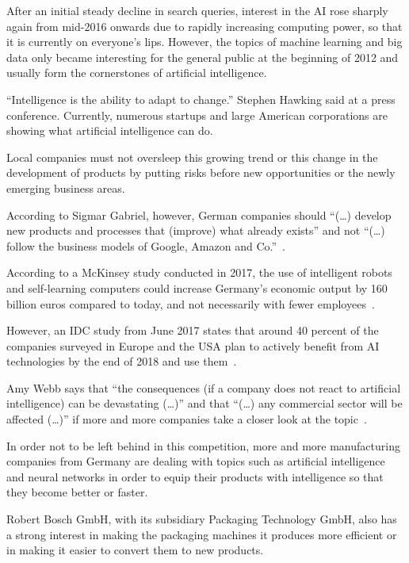 After an initial steady decline in search queries, interest in the AI rose sharply again from mid-2016 onwards due to
rapidly increasing computing power, so that it is currently on everyone's lips. However, the topics of machine learning
and big data only became interesting for the general public at the beginning of 2012 and usually form the cornerstones
of artificial intelligence.

\enquote{Intelligence is the ability to adapt to change.} Stephen Hawking said at a press conference. Currently,
numerous startups and large American corporations are showing what artificial intelligence can do.

Local companies must not oversleep this growing trend or this change in the development of products by putting risks
before new opportunities or the newly emerging business areas.

According to Sigmar Gabriel, however, German companies should \enquote{(\ldots) develop new products and processes that
(improve) what already exists} and not \enquote{(\ldots) follow the business models of Google, Amazon and
Co.}~\cite{article_einleitung_ww_sg}.

According to a McKinsey study conducted in 2017, the use of intelligent robots and self-learning computers could
increase Germany's economic output by 160 billion euros compared to today, and not necessarily with fewer
employees~\cite{online_einleitung_mckinsey}.

However, an IDC study from June 2017 states that around 40 percent of the companies surveyed in Europe and the USA plan
to actively benefit from AI technologies by the end of 2018 and use them~\cite{article_grundlagen_salesforce}.

Amy Webb says that \enquote{the consequences (if a company does not react to artificial intelligence) can be devastating
(\ldots)} and that \enquote{(\ldots) any commercial sector will be affected (\ldots)} if more and more companies take a
closer look at the topic~\cite{article_einleitung_dub_aw}.

In order not to be left behind in this competition, more and more manufacturing companies from Germany are dealing with
topics such as artificial intelligence and neural networks in order to equip their products with intelligence so that
they become better or faster.

Robert Bosch GmbH, with its subsidiary Packaging Technology GmbH, also has a strong interest in making the packaging
machines it produces more efficient or in making it easier to convert them to new products.

